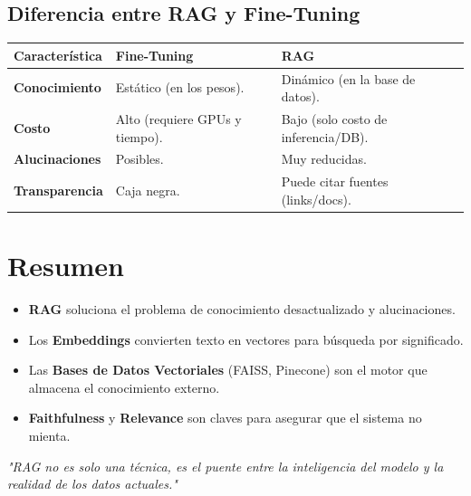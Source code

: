 \documentclass[12pt,a4paper,openany,oneside]{book}
\begin{document}
\subsection{Diferencia entre RAG y Fine-Tuning}
\begin{center}
\begin{tabular}{|l|p{5cm}|p{5cm}|}
\hline
\rowcolor{gray!20} \textbf{Característica} & \textbf{Fine-Tuning} & \textbf{RAG} \\ \hline
\textbf{Conocimiento} & Estático (en los pesos). & Dinámico (en la base de datos). \\ \hline
\textbf{Costo} & Alto (requiere GPUs y tiempo). & Bajo (solo costo de inferencia/DB). \\ \hline
\textbf{Alucinaciones} & Posibles. & Muy reducidas. \\ \hline
\textbf{Transparencia} & Caja negra. & Puede citar fuentes (links/docs). \\ \hline
\end{tabular}
\end{center}

\section{Resumen}
\begin{itemize}
    \item \textbf{RAG} soluciona el problema de conocimiento desactualizado y alucinaciones.
    \item Los \textbf{Embeddings} convierten texto en vectores para búsqueda por significado.
    \item Las \textbf{Bases de Datos Vectoriales} (FAISS, Pinecone) son el motor que almacena el conocimiento externo.
    \item \textbf{Faithfulness} y \textbf{Relevance} son claves para asegurar que el sistema no mienta.
\end{itemize}

\vspace{1cm}
\begin{center}
    \textit{"RAG no es solo una técnica, es el puente entre la inteligencia del modelo y la realidad de los datos actuales."}
\end{center}
\end{document}
